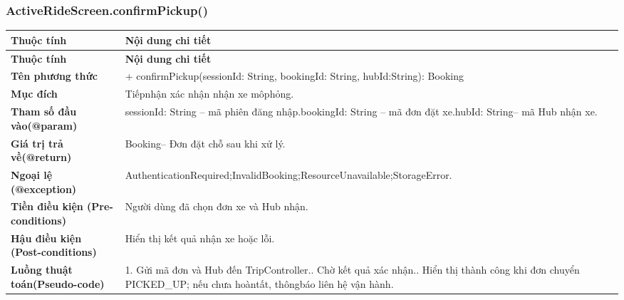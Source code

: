 \subsubsection{ActiveRideScreen.confirmPickup()}
\begin{longtable}{|L{0.24\textwidth}|L{0.70\textwidth}|}
\hline
\textbf{Thuộc tính} & \textbf{Nội dung chi tiết} \\
\hline
\endfirsthead
\hline
\textbf{Thuộc tính} & \textbf{Nội dung chi tiết} \\
\hline
\endhead
\textbf{Tên phương thức} & + confirmPickup(sessionId: String, bookingId: String, hubId:\newline String): Booking \\
\hline
\textbf{Mục đích} & Tiếpnhận xác nhận nhận xe môphỏng. \\
\hline
\textbf{Tham số đầu vào}\newline \textbf{(@param)} & sessionId: String – mã phiên đăng nhập.\newline bookingId: String – mã đơn đặt xe.\newline hubId: String– mã Hub nhận xe. \\
\hline
\textbf{Giá trị trả về(@return)} & Booking– Đơn đặt chỗ sau khi xử lý. \\
\hline
\textbf{Ngoại lệ (@exception)} & AuthenticationRequired;\newline InvalidBooking;\newline ResourceUnavailable;\newline StorageError. \\
\hline
\textbf{Tiền điều kiện (Pre-}\newline \textbf{conditions)} & Người dùng đã chọn đơn xe và Hub nhận. \\
\hline
\textbf{Hậu điều kiện (Post-}\newline \textbf{conditions)} & Hiển thị kết quả nhận xe hoặc lỗi. \\
\hline
\textbf{Luồng thuật toán}\newline \textbf{(Pseudo-code)} & 1. Gửi mã đơn và Hub đến TripController.. Chờ kết quả xác nhận.. Hiển thị thành công khi đơn chuyển PICKED\_UP; nếu chưa hoàn\newline tất, thôngbáo liên hệ vận hành. \\
\hline
\end{longtable}
\vspace{-0.5\baselineskip}
